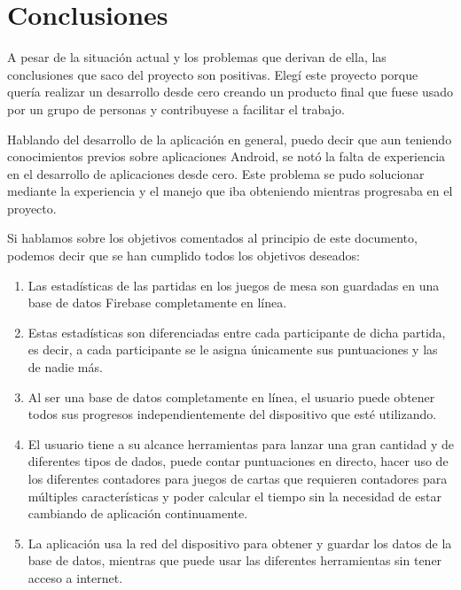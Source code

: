 \chapter{Conclusiones}\label{cap:conclusiones}

A pesar de la situación actual y los problemas que derivan de ella, las conclusiones que saco del proyecto son positivas. Elegí este proyecto porque quería realizar un desarrollo desde cero creando un producto final que fuese usado por un grupo de personas y contribuyese a facilitar el trabajo.

Hablando del desarrollo de la aplicación en general, puedo decir que aun teniendo conocimientos previos sobre aplicaciones Android, se notó la falta de experiencia en el desarrollo de aplicaciones desde cero. Este problema se pudo solucionar mediante la experiencia y el manejo que iba obteniendo mientras progresaba en el proyecto.

Si hablamos sobre los objetivos comentados al principio de este documento, podemos decir que se han cumplido todos los objetivos deseados: 

\begin{enumerate}
    \item Las estadísticas de las partidas en los juegos de mesa son guardadas en una base de datos Firebase completamente en línea.
    \item Estas estadísticas son diferenciadas entre cada participante de dicha partida, es decir, a cada participante se le asigna únicamente sus puntuaciones y las de nadie más.
    \item Al ser una base de datos completamente en línea, el usuario puede obtener todos sus progresos independientemente del dispositivo que esté utilizando.
    \item El usuario tiene a su alcance herramientas para lanzar una gran cantidad y de diferentes tipos de dados, puede contar puntuaciones en directo, hacer uso de los diferentes contadores para juegos de cartas que requieren contadores para múltiples características y poder calcular el tiempo sin la necesidad de estar cambiando de aplicación continuamente.
    \item La aplicación usa la red del dispositivo para obtener y guardar los datos de la base de datos, mientras que puede usar las diferentes herramientas sin tener acceso a internet.
\end{enumerate}

